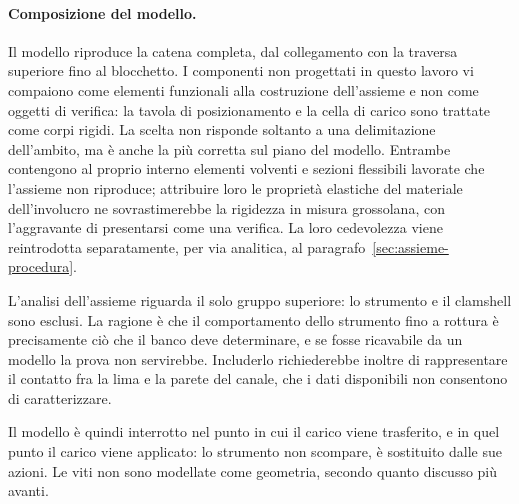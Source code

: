 \paragraph{Composizione del modello.}
Il modello riproduce la catena completa, dal collegamento con la traversa
superiore fino al blocchetto. I componenti non progettati in questo lavoro vi
compaiono come elementi funzionali alla costruzione dell'assieme e non come oggetti di verifica: la tavola
di posizionamento e la cella di carico sono trattate come corpi rigidi. La
scelta non risponde soltanto a una delimitazione dell'ambito, ma è anche la più
corretta sul piano del modello. Entrambe contengono al proprio interno elementi
volventi e sezioni flessibili lavorate che l'assieme non riproduce; attribuire
loro le proprietà elastiche del materiale dell'involucro ne sovrastimerebbe la
rigidezza in misura grossolana, con l'aggravante di presentarsi come una
verifica. La loro cedevolezza viene reintrodotta separatamente, per via
analitica, al paragrafo~\ref{sec:assieme-procedura}.

L'analisi dell'assieme riguarda il solo gruppo superiore: lo strumento e il
clamshell sono esclusi. La ragione è che il comportamento dello strumento fino a
rottura è precisamente ciò che il banco deve determinare, e se fosse ricavabile
da un modello la prova non servirebbe. Includerlo richiederebbe inoltre di
rappresentare il contatto fra la lima e la parete del canale, che i dati
disponibili non consentono di caratterizzare.

Il modello è quindi interrotto nel punto in cui il carico viene trasferito, e in quel punto il carico viene applicato: lo strumento non scompare, è sostituito dalle sue azioni. Le viti non sono modellate come geometria, secondo quanto discusso più avanti.

